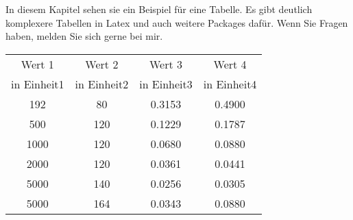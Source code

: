 
In diesem Kapitel sehen sie ein Beispiel für eine Tabelle. Es gibt deutlich komplexere Tabellen in Latex und auch weitere Packages dafür. Wenn Sie Fragen haben, melden Sie sich gerne bei mir.

\begin{center}
\begin{tabular}{|c|c|c|c|}
\hline
Wert 1 & Wert 2 & Wert 3 & Wert 4\\
in Einheit1 & in Einheit2 & in Einheit3 & in Einheit4 \\
\hline
192 & 80& 0.3153 & 0.4900\\
500 & 120& 0.1229& 0.1787\\
1000 & 120& 0.0680& 0.0880\\
2000 & 120& 0.0361& 0.0441\\
5000 & 140& 0.0256& 0.0305\\
5000 & 164& 0.0343& 0.0880\\
\hline
\end{tabular}
\label{tab:table1}
\end{center}

